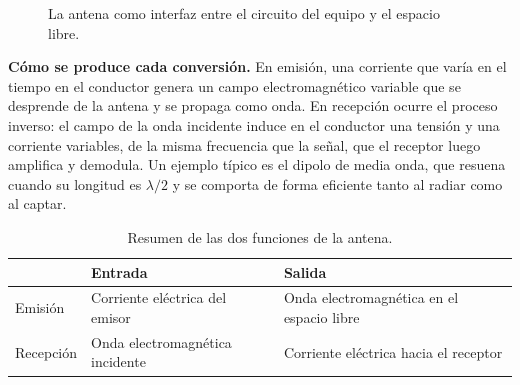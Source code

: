 \documentclass[11pt,a4paper]{article}
\begin{document}
\begin{enumerate}[label=4.\arabic*), itemsep=0.3cm]
\begin{figure}[h]
          \caption{La antena como interfaz entre el circuito del equipo y el espacio libre.}
        \end{figure}

        \textbf{Cómo se produce cada conversión.} En emisión, una corriente que varía en el tiempo en el conductor genera un campo electromagnético variable que se desprende de la antena y se propaga como onda. En recepción ocurre el proceso inverso: el campo de la onda incidente induce en el conductor una tensión y una corriente variables, de la misma frecuencia que la señal, que el receptor luego amplifica y demodula. Un ejemplo típico es el dipolo de media onda, que resuena cuando su longitud es $\lambda/2$ y se comporta de forma eficiente tanto al radiar como al captar.

        \begin{table}[h]
          \centering
          \begin{tabular}{lll}
            \toprule
            & \textbf{Entrada} & \textbf{Salida} \\
            \midrule
            Emisión    & Corriente eléctrica del emisor & Onda electromagnética en el espacio libre \\
            Recepción  & Onda electromagnética incidente & Corriente eléctrica hacia el receptor \\
            \bottomrule
          \end{tabular}
          \caption{Resumen de las dos funciones de la antena.}
        \end{table}


\end{enumerate}
\end{document}
